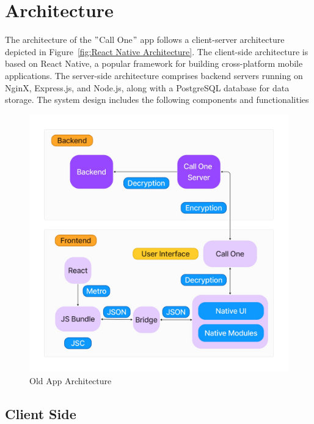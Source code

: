\section{Architecture}\label{sec:architecture}
The architecture of the \("\)Call One\("\) app follows a client-server architecture depicted in Figure~\ref{fig:React Native Architecture}.
The client-side architecture is based on React Native, a popular framework for building cross-platform mobile applications.
The server-side architecture comprises backend servers running on NginX, Express.js, and Node.js, along with a PostgreSQL database for data storage.
The system design includes the following components and functionalities

\begin{figure}
    \centering
    \includegraphics[width=1\linewidth]{Media/arch}
    \caption{Old App Architecture}
    \label{fig:Old App Architecture}
\end{figure}


\subsection{Client Side}\label{subsec:client-side}

